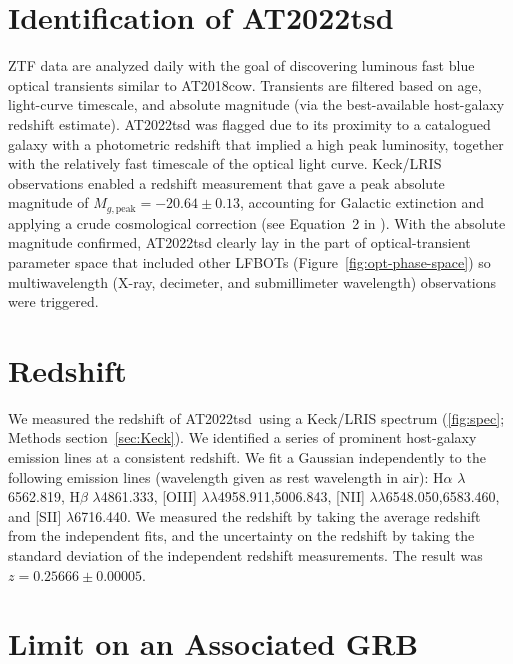 \documentclass{nature_plusfigure}
\newcommand{\at}{AT2022tsd}
\begin{document}
\begin{methods}

\section{Identification of \at}
\label{Methods:Identification}

ZTF data are analyzed daily with the goal of discovering luminous fast blue optical transients similar to AT2018cow.
Transients are filtered based on age, light-curve timescale, and absolute magnitude (via the best-available host-galaxy redshift estimate).
AT2022tsd was flagged due to its proximity to a catalogued galaxy with a photometric redshift that implied a high peak luminosity, together with the relatively fast timescale of the optical light curve.
Keck/LRIS observations enabled a redshift measurement that gave a peak absolute magnitude of $M_{g, \mathrm{peak}}=-20.64\pm0.13$, accounting for Galactic extinction and applying a crude cosmological correction (see Equation~2 in \cite{Ho2020Koala}).
With the absolute magnitude confirmed, AT2022tsd clearly lay in the part of optical-transient parameter space that included other LFBOTs (Figure~\ref{fig:opt-phase-space}) so
multiwavelength (X-ray, decimeter, and submillimeter wavelength) observations were triggered.

\section{Redshift}
\label{sec:redshift}

We measured the redshift of \at\ using a Keck/LRIS spectrum (\ref{fig:spec}; Methods section~\ref{sec:Keck}).
We identified a series of prominent host-galaxy emission lines at a consistent redshift.
We fit a Gaussian independently to the following emission lines (wavelength given as rest wavelength in air): H$\alpha$ $\lambda$6562.819, H$\beta$ $\lambda$4861.333, 
 [OIII] $\lambda$$\lambda$4958.911,5006.843, 
  [NII] $\lambda$$\lambda$6548.050,6583.460, and [SII] $\lambda$6716.440. 
We measured the redshift by taking the average redshift from the independent fits, and the uncertainty on the redshift by taking the standard deviation of the independent redshift measurements.
The result was $z=0.25666\pm0.00005$.

\section{Limit on an Associated GRB}
\label{sec:grbsearch}


\end{methods}
\end{document}
